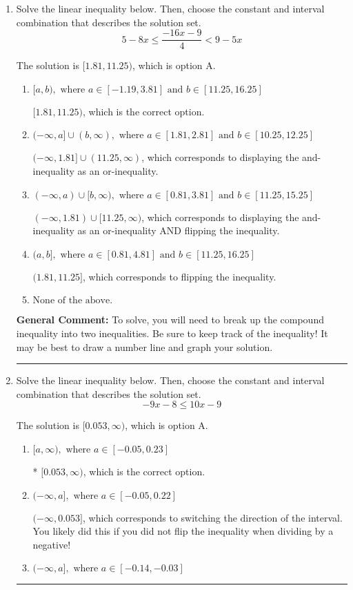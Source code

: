 \documentclass{extbook}[14pt]
\newcommand{\litem}[1]{\item #1

\rule{\textwidth}{0.4pt}}
\begin{document}
\begin{enumerate}\litem{
Solve the linear inequality below. Then, choose the constant and interval combination that describes the solution set.
\[ 5 - 8 x \leq \frac{-16 x - 9}{4} < 9 - 5 x \]

The solution is \( [1.81, 11.25) \), which is option A.\begin{enumerate}[label=\Alph*.]
\item \( [a, b), \text{ where } a \in [-1.19, 3.81] \text{ and } b \in [11.25, 16.25] \)

$[1.81, 11.25)$, which is the correct option.
\item \( (-\infty, a] \cup (b, \infty), \text{ where } a \in [1.81, 2.81] \text{ and } b \in [10.25, 12.25] \)

$(-\infty, 1.81] \cup (11.25, \infty)$, which corresponds to displaying the and-inequality as an or-inequality.
\item \( (-\infty, a) \cup [b, \infty), \text{ where } a \in [0.81, 3.81] \text{ and } b \in [11.25, 15.25] \)

$(-\infty, 1.81) \cup [11.25, \infty)$, which corresponds to displaying the and-inequality as an or-inequality AND flipping the inequality.
\item \( (a, b], \text{ where } a \in [0.81, 4.81] \text{ and } b \in [11.25, 16.25] \)

$(1.81, 11.25]$, which corresponds to flipping the inequality.
\item \( \text{None of the above.} \)


\end{enumerate}

\textbf{General Comment:} To solve, you will need to break up the compound inequality into two inequalities. Be sure to keep track of the inequality! It may be best to draw a number line and graph your solution.
}
\litem{
Solve the linear inequality below. Then, choose the constant and interval combination that describes the solution set.
\[ -9x -8 \leq 10x -9 \]

The solution is \( [0.053, \infty) \), which is option A.\begin{enumerate}[label=\Alph*.]
\item \( [a, \infty), \text{ where } a \in [-0.05, 0.23] \)

* $[0.053, \infty)$, which is the correct option.
\item \( (-\infty, a], \text{ where } a \in [-0.05, 0.22] \)

 $(-\infty, 0.053]$, which corresponds to switching the direction of the interval. You likely did this if you did not flip the inequality when dividing by a negative!
\item \( (-\infty, a], \text{ where } a \in [-0.14, -0.03] \)


\end{enumerate}}
\end{enumerate}
\end{document}
